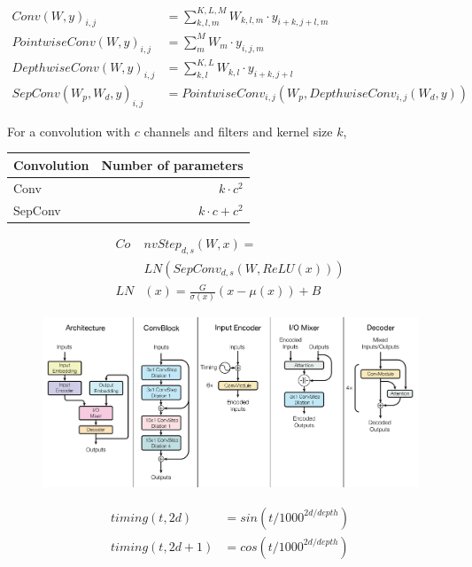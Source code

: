 \documentclass[a4paper]{article}
\begin{document}
\begin{align*}
  Conv(W, y)_{i,j} &= \sum_{k,l,m}^{K,L,M}{W_{k,l,m} \cdot y_{i+k,j+l,m}}
  \\
  PointwiseConv(W, y)_{i,j} &= \sum_{m}^{M}{W_m \cdot y_{i,j,m}} \\
  DepthwiseConv(W, y)_{i,j} &= \sum_{k,l}^{K,L}{W_{k,l} \cdot y_{i+k,j+l}} \\
  SepConv(W_p, W_d, y)_{i,j} &=
    PointwiseConv_{i,j}(W_p, DepthwiseConv_{i,j}(W_d, y))
\end{align*}


For a convolution with $c$ channels and filters and kernel size $k$,


\begin{center}
  \begin{tabular}{lr}
  \hline
    Convolution & Number of parameters\\
  \hline
    Conv & $k \cdot c^2$ \\
    SepConv & $k \cdot c + c^2$ \\
  \hline
  \end{tabular}
\end{center}


\begin{align*}
  Co&nvStep_{d,s}(W, x) = \\
  &LN(SepConv_{d,s}(W, ReLU(x))) \\
  LN&(x) = \frac{G}{\sigma(x)}(x - \mu(x)) + B
\end{align*}


\begin{figure}
  \center
  \includegraphics[width=\textwidth]{img/SN}
\end{figure}


\begin{align*}
  timing(t, 2d) &= sin(t/1000^{2d/depth}) \\
  timing(t, 2d + 1) &= cos(t/1000^{2d/depth})
\end{align*}
\end{document}
